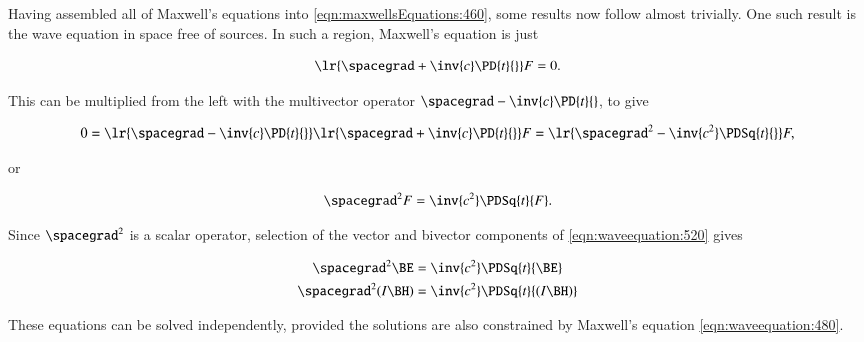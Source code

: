 %
%
Having assembled all of Maxwell's equations into \cref{eqn:maxwellsEquations:460}, some results now follow almost trivially.
One such result is the wave equation in space free of sources.
In such a region, Maxwell's equation is just

\begin{dmath}\label{eqn:waveequation:480}
\lr{ \spacegrad + \inv{c} \PD{t}{} } F = 0.
\end{dmath}

This can be multiplied from the left with the multivector operator \( \spacegrad - \inv{c} \PD{t}{} \), to give

\begin{dmath}\label{eqn:waveequation:500}
0 =
\lr{ \spacegrad - \inv{c} \PD{t}{} }
\lr{ \spacegrad + \inv{c} \PD{t}{} } F
=
\lr{ \spacegrad^2 - \inv{c^2} \PDSq{t}{} } F,
\end{dmath}

or

\begin{dmath}\label{eqn:waveequation:520}
\spacegrad^2 F = \inv{c^2} \PDSq{t}{F}.
\end{dmath}

Since \( \spacegrad^2 \) is a scalar operator, selection of the vector and bivector components of \cref{eqn:waveequation:520} gives

\begin{dmath}\label{eqn:waveequation:540}
\begin{aligned}
\spacegrad^2 \BE &= \inv{c^2} \PDSq{t}{\BE} \\
\spacegrad^2 (I \BH) &= \inv{c^2} \PDSq{t}{(I \BH)} \\
\end{aligned}
\end{dmath}

These equations can be solved independently, provided the solutions are also constrained by Maxwell's equation \cref{eqn:waveequation:480}.

